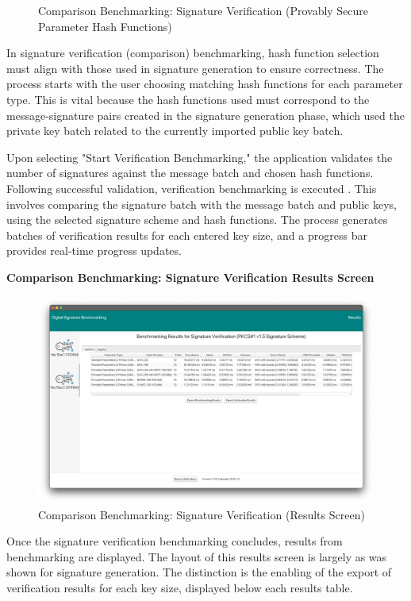 \documentclass[]{final_report}
\begin{document}
\begin{figure}[H]
\begin{minipage}{0.49\textwidth}
       \caption{Comparison Benchmarking: Signature Verification (Provably Secure Parameter Hash Functions)}
        \label{fig:image2}
    \end{minipage}
\end{figure}


In signature verification (comparison) benchmarking, hash function selection must align with those used in signature generation to ensure correctness. The process starts with the user choosing matching hash functions for each parameter type. This is vital because the hash functions used must correspond to the message-signature pairs created in the signature generation phase, which used the private key batch related to the currently imported public key batch.

Upon selecting "Start Verification Benchmarking," the application validates the number of signatures against the message batch and chosen hash functions.  Following successful validation,  verification benchmarking is executed . This involves comparing the signature batch with the message batch and public keys, using the selected signature scheme and hash functions. The process generates batches of verification results for each entered key size, and a progress bar provides real-time progress updates.


\textbf{Comparison Benchmarking: Signature Verification Results Screen}

\begin{figure}[H]
    \centering
    \includegraphics[scale= 0.325]{main_pictures/ui/verifying/verifying6.png}
   \caption{Comparison Benchmarking: Signature Verification (Results Screen)}
\end{figure}

Once the signature verification benchmarking concludes, results from benchmarking are displayed. The layout of this results screen is largely as was shown for signature generation. The distinction is the enabling of the export of verification results for each key size, displayed below each results table.
\end{document}
